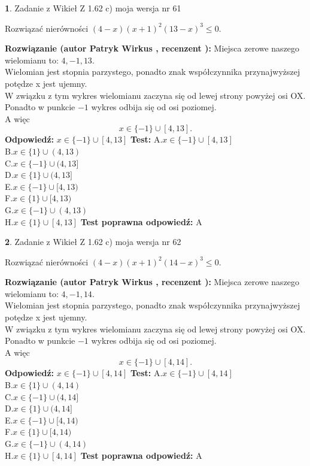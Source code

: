 \documentclass[12pt, a4paper]{article}
\theoremstyle{definition} %
\newtheorem{zad}{}
\newcommand{\zadStart}[1]{\begin{zad}#1\newline}
\newcommand{\zadStop}{\end{zad}}
\newcommand{\rozwStart}[2]{\noindent \textbf{Rozwiązanie (autor #1 , recenzent #2): }\newline}
\newcommand{\rozwStop}{\newline}
\newcommand{\odpStart}{\noindent \textbf{Odpowiedź:}\newline}
\newcommand{\odpStop}{\newline}
\newcommand{\testStart}{\noindent \textbf{Test:}\newline}
\newcommand{\testStop}{\newline}
\newcommand{\kluczStart}{\noindent \textbf{Test poprawna odpowiedź:}\newline}
\newcommand{\kluczStop}{\newline}
\begin{document}
\zadStart{Zadanie z Wikieł Z 1.62 c) moja wersja nr 61}

Rozwiązać nierówności $(4-x)(x+1)^{2}(13-x)^{3}\le0$.
\zadStop
\rozwStart{Patryk Wirkus}{}
Miejsca zerowe naszego wielomianu to: $4, -1, 13$.\\
Wielomian jest stopnia parzystego, ponadto znak współczynnika przy\linebreak najwyższej potędze x jest ujemny.\\ W związku z tym wykres wielomianu zaczyna się od lewej strony powyżej osi OX.\\
Ponadto w punkcie $-1$ wykres odbija się od osi poziomej.\\
A więc $$x \in \{-1\} \cup [4,13].$$
\rozwStop
\odpStart
$x \in \{-1\} \cup [4,13]$
\odpStop
\testStart
A.$x \in \{-1\} \cup [4,13]$\\
B.$x \in \{1\} \cup (4,13)$\\
C.$x \in \{-1\} \cup (4,13]$\\
D.$x \in \{1\} \cup (4,13]$\\
E.$x \in \{-1\} \cup [4,13)$\\
F.$x \in \{1\} \cup [4,13)$\\
G.$x \in \{-1\} \cup (4,13)$\\
H.$x \in \{1\} \cup [4,13]$
\testStop
\kluczStart
A
\kluczStop



\zadStart{Zadanie z Wikieł Z 1.62 c) moja wersja nr 62}

Rozwiązać nierówności $(4-x)(x+1)^{2}(14-x)^{3}\le0$.
\zadStop
\rozwStart{Patryk Wirkus}{}
Miejsca zerowe naszego wielomianu to: $4, -1, 14$.\\
Wielomian jest stopnia parzystego, ponadto znak współczynnika przy\linebreak najwyższej potędze x jest ujemny.\\ W związku z tym wykres wielomianu zaczyna się od lewej strony powyżej osi OX.\\
Ponadto w punkcie $-1$ wykres odbija się od osi poziomej.\\
A więc $$x \in \{-1\} \cup [4,14].$$
\rozwStop
\odpStart
$x \in \{-1\} \cup [4,14]$
\odpStop
\testStart
A.$x \in \{-1\} \cup [4,14]$\\
B.$x \in \{1\} \cup (4,14)$\\
C.$x \in \{-1\} \cup (4,14]$\\
D.$x \in \{1\} \cup (4,14]$\\
E.$x \in \{-1\} \cup [4,14)$\\
F.$x \in \{1\} \cup [4,14)$\\
G.$x \in \{-1\} \cup (4,14)$\\
H.$x \in \{1\} \cup [4,14]$
\testStop
\kluczStart
A
\kluczStop
\end{document}
